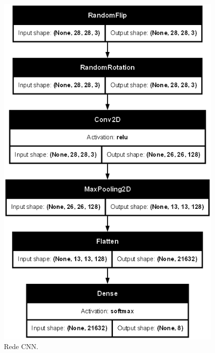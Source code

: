 \documentclass[final,5p]{elsarticle}
\numberwithin{equation}{section}
\begin{document}
\begin{figure}[H]
    \includegraphics[width=0.95\columnwidth]{CNN_Simple_model.png}
    \caption{Rede CNN.}\label{fig:ModeloCNN}
\end{figure}
\end{document}
